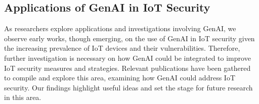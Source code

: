 \subsection{Applications of GenAI in IoT Security}
%
As researchers explore applications and investigations involving GenAI, we observe early works, though emerging, on the use of GenAI in IoT security given the increasing prevalence of IoT devices and their vulnerabilities.
Therefore, further investigation is necessary on how GenAI could be integrated to improve IoT security measures and strategies.
Relevant publications have been gathered to compile and explore this area, examining how GenAI could address IoT security.
Our findings highlight useful ideas and set the stage for future research in this area.